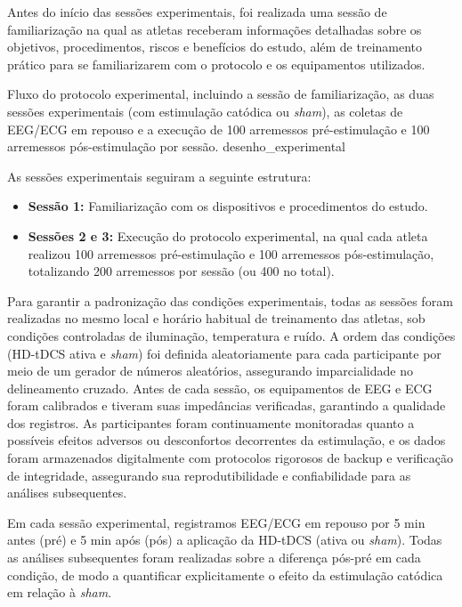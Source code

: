 Antes do início das sessões experimentais, foi realizada uma sessão de familiarização na qual as atletas receberam informações detalhadas sobre os objetivos, procedimentos, riscos e benefícios do estudo, além de treinamento prático para se familiarizarem com o protocolo e os equipamentos utilizados.

{Fluxo do protocolo experimental, incluindo a sessão de familiarização, as duas sessões experimentais (com estimulação catódica ou \textit{sham}), as coletas de EEG/ECG em repouso e a execução de 100 arremessos pré-estimulação e 100 arremessos pós-estimulação por sessão.}
{desenho_experimental}

As sessões experimentais seguiram a seguinte estrutura:
\begin{itemize}
    \item \textbf{Sessão 1:} Familiarização com os dispositivos e procedimentos do estudo.
    \item \textbf{Sessões 2 e 3:} Execução do protocolo experimental, na qual cada atleta realizou 100 arremessos pré-estimulação e 100 arremessos pós-estimulação, totalizando 200 arremessos por sessão (ou 400 no total).
\end{itemize}

Para garantir a padronização das condições experimentais, todas as sessões foram realizadas no mesmo local e horário habitual de treinamento das atletas, sob condições controladas de iluminação, temperatura e ruído. A ordem das condições (HD-tDCS ativa e \textit{sham}) foi definida aleatoriamente para cada participante por meio de um gerador de números aleatórios, assegurando imparcialidade no delineamento cruzado. Antes de cada sessão, os equipamentos de EEG e ECG foram calibrados e tiveram suas impedâncias verificadas, garantindo a qualidade dos registros. As participantes foram continuamente monitoradas quanto a possíveis efeitos adversos ou desconfortos decorrentes da estimulação, e os dados foram armazenados digitalmente com protocolos rigorosos de backup e verificação de integridade, assegurando sua reprodutibilidade e confiabilidade para as análises subsequentes.

Em cada sessão experimental, registramos EEG/ECG em repouso por 5 min antes (pré) e 5 min após (pós) a aplicação da HD-tDCS (ativa ou \textit{sham}). Todas as análises subsequentes foram realizadas sobre a diferença pós-pré em cada condição, de modo a quantificar explicitamente o efeito da estimulação catódica em relação à \textit{sham}.

